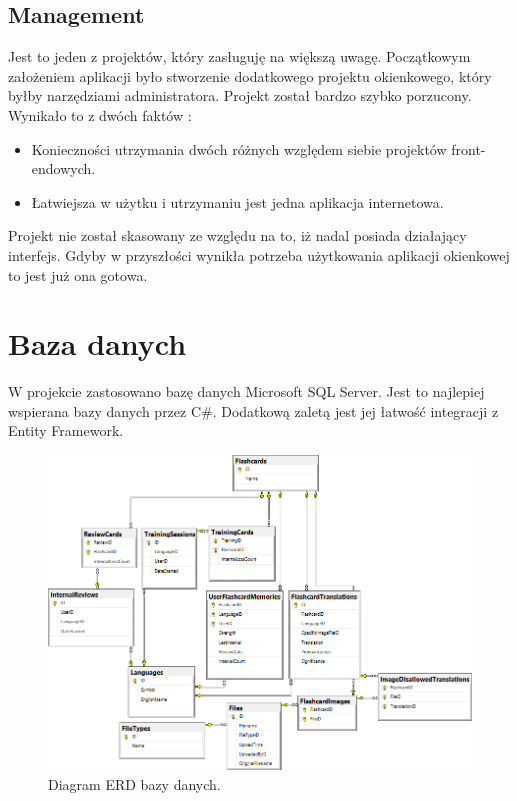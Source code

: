 \subsection{Management}

Jest to jeden z projektów, który zasługuję na większą uwagę. Początkowym założeniem aplikacji było stworzenie dodatkowego projektu okienkowego, który byłby narzędziami administratora. Projekt został bardzo szybko porzucony. Wynikało to z dwóch faktów :
\begin{itemize}
\setlength\itemsep{1mm}
	\item Konieczności utrzymania dwóch różnych względem siebie projektów front-endowych.
	\item Łatwiejsza w użytku  i utrzymaniu jest jedna aplikacja internetowa.
\end{itemize}
Projekt nie został skasowany ze względu na to, iż nadal posiada działający interfejs. Gdyby w przyszłości wynikła potrzeba użytkowania aplikacji okienkowej to jest już ona gotowa.


\section{Baza danych}

W projekcie zastosowano bazę danych Microsoft SQL Server. Jest to najlepiej wspierana bazy danych przez C\#. Dodatkową zaletą jest jej łatwość integracji z Entity Framework.

\begin{landscape}
\begin{figure}
	\centering
  \includegraphics[height=\textheight]{images/erd.png}
  \caption{Diagram ERD bazy danych.}
\end{figure}
\end{landscape}


